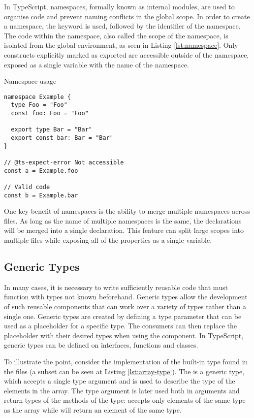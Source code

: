 In TypeScript, namespaces, formally known as internal modules, are used to organise code and prevent naming conflicts in the global scope. In order to create a namespace, the  keyword is used, followed by the identifier of the namespace. The code within the namespace, also called the scope of the namespace, is isolated from the global environment, as seen in Listing \ref{lst:namespace}. Only constructs explicitly marked as exported are accessible outside of the namespace, exposed as a single variable with the name of the namespace.

\begin{listing}[ht]
\caption{Namespace usage}\label{lst:namespace}
\begin{verbatim}
namespace Example {
  type Foo = "Foo"
  const foo: Foo = "Foo"
  
  export type Bar = "Bar"
  export const bar: Bar = "Bar"
}

// @ts-expect-error Not accessible
const a = Example.foo 

// Valid code
const b = Example.bar
\end{verbatim}
\end{listing}

One key benefit of namespaces is the ability to merge multiple namespaces across files. As long as the name of multiple namespaces is the same, the declarations will be merged into a single declaration. This feature can split large scopes into multiple files while exposing all of the properties as a single variable. 

\subsection{Generic Types}

In many cases, it is necessary to write sufficiently reusable code that must function with types not known beforehand. Generic types allow the development of such reusable components that can work over a variety of types rather than a single one. Generic types are created by defining a type parameter that can be used as a placeholder for a specific type. The consumers can then replace the placeholder with their desired types when using the component. In TypeScript, generic types can be defined on interfaces, functions and classes.

To illustrate the point, consider the implementation of the built-in  type found in the  files (a subset can be seen at Listing \ref{lst:array-type}). The  is a generic type, which accepts a single type argument  and is used to describe the type of the elements in the array. The type argument  is later used both in arguments and return types of the methods of the  type:  accepts only elements of the same type as the array while  will return an element of the same type.

